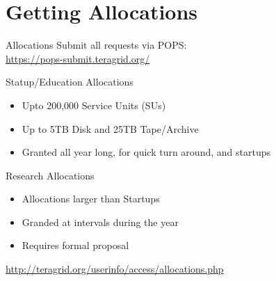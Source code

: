 \documentclass[handout]{beamer}
\begin{document}
  \section{Getting Allocations}
  \begin{frame}{Allocations}
    Submit all requests via POPS: \\
    \url{https://pops-submit.teragrid.org/}
   \begin{block}{Statup/Education Allocations}
    \begin{itemize}
     \item Upto 200,000 Service Units (SUs)
     \item Up to 5TB Disk and 25TB Tape/Archive
     \item Granted all year long, for quick turn around, and startups
    \end{itemize}
   \end{block}
   \begin{block}{Research Allocations}
    \begin{itemize}
     \item Allocations larger than Startups
     \item Granded at intervals during the year
     \item Requires formal proposal
    \end{itemize}
     \url{http://teragrid.org/userinfo/access/allocations.php}
   \end{block}
  \end{frame}
\end{document}

